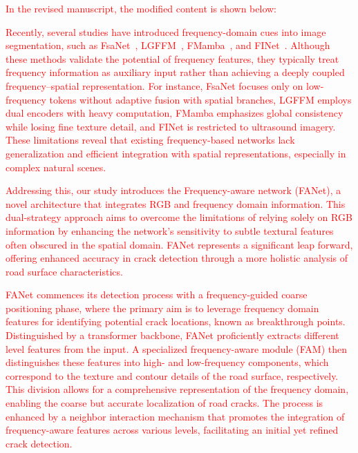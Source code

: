 \documentclass[lettersize,journal,onecolumn,12pt]{IEEEtran}
\begin{document}
\textcolor{red}{In the revised manuscript, the modified content is shown below:}

\textcolor{red}{
Recently, several studies have introduced frequency-domain cues into image segmentation, such as FsaNet~\cite{DBLP:journals/tip/ZhangPG23}, LGFFM~\cite{11129883TMI}, FMamba~\cite{DBLP:journals/tim/LiuLLWZS25}, and FINet~\cite{DBLP:journals/tcsv/WangZZGY25}. 
Although these methods validate the potential of frequency features, they typically treat frequency information as auxiliary input rather than achieving a deeply coupled frequency–spatial representation. 
For instance, FsaNet focuses only on low-frequency tokens without adaptive fusion with spatial branches, LGFFM employs dual encoders with heavy computation, FMamba emphasizes global consistency while losing fine texture detail, and FINet is restricted to ultrasound imagery. 
These limitations reveal that existing frequency-based networks lack generalization and efficient integration with spatial representations, especially in complex natural scenes.
}


\textcolor{red}{Addressing this, our study introduces the Frequency-aware network (FANet), a novel architecture that integrates RGB and frequency domain information. This dual-strategy approach aims to overcome the limitations of relying solely on RGB information by enhancing the network's sensitivity to subtle textural features often obscured in the spatial domain. FANet represents a significant leap forward, offering enhanced accuracy in crack detection through a more holistic analysis of road surface characteristics.}

\textcolor{red}{FANet commences its detection process with a frequency-guided coarse positioning phase, where the primary aim is to leverage frequency domain features for identifying potential crack locations, known as breakthrough points. Distinguished by a transformer backbone, FANet proficiently extracts different level features from the input. A specialized frequency-aware module (FAM) then distinguishes these features into high- and low-frequency components, which correspond to the texture and contour details of the road surface, respectively. This division allows for a comprehensive representation of the frequency domain, enabling the coarse but accurate localization of road cracks. The process is enhanced by a neighbor interaction mechanism that promotes the integration of frequency-aware features across various levels, facilitating an initial yet refined crack detection.}
\end{document}
